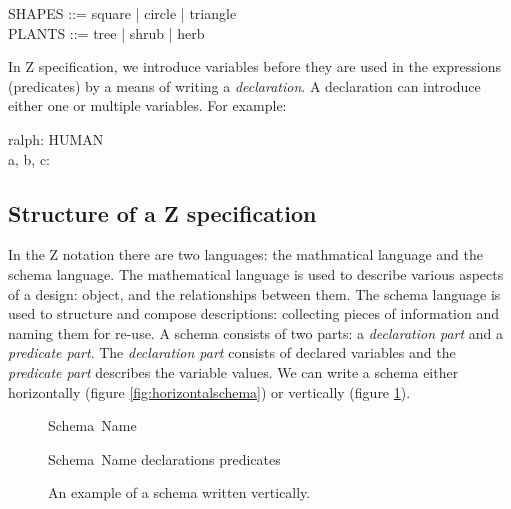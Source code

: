 \begin{zed}
SHAPES ::= square | circle | triangle \\
PLANTS ::= tree | shrub | herb \\
\end{zed}

In Z specification, we introduce variables before they are used in the expressions (predicates) by a means of writing a \textit{declaration}. A declaration can introduce either one or multiple variables. For example:

\begin{zed}
ralph: HUMAN \\
a, b, c: \nat
\end{zed}

\subsection{Structure of a Z specification}

In the Z notation there are two languages: the mathmatical language and the schema language. The mathematical language is used to describe various aspects of a design: object, and the relationships between them. The schema language is used to structure and compose descriptions: collecting pieces of information and naming them for re-use. A schema consists of two parts: a \emph{declaration part} and a \emph{predicate part}. The \emph{declaration part} consists of declared variables and the \emph{predicate part} describes the variable values. We can write a schema either horizontally (figure \ref{fig:horizontalschema}) or vertically (figure \ref{fig:verticalschema}).

\begin{figure}[H]
\vspace{-0.2in}
\centering
\begin{minipage}{0.45\textwidth}
\begin{zed}
\noindent Schema\ Name 
\end{zed}
\vspace{-0.18in}
\caption{An example of a schema written horizontally.\label{fig:horizontalschema}}
\vspace{-0.2in}
\end{minipage}\hfill
\begin{minipage}{0.45\textwidth}
\begin{schema}{Schema\ Name}
declarations
\where
predicates
\end{schema}
\vspace{-0.2in}
\caption{An example of a schema written vertically. \label{fig:verticalschema}}
\vspace{-0.2in}
\end{minipage}
\end{figure}

